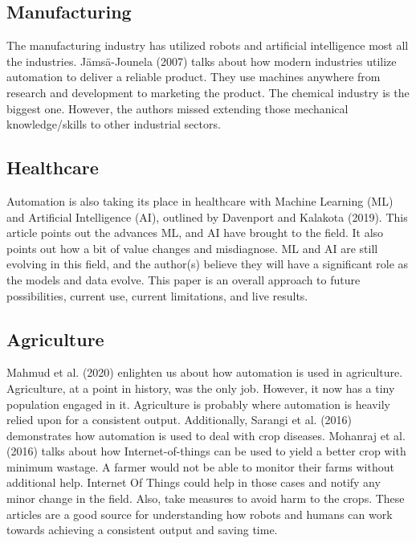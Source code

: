 \documentclass[
  man,floatsintext]{apa7}
\begin{document}
\hypertarget{manufacturing}{%
\subsection{Manufacturing}\label{manufacturing}}

The manufacturing industry has utilized robots and artificial intelligence most all the industries. Jämsä-Jounela (2007) talks about how modern industries utilize automation to deliver a reliable product. They use machines anywhere from research and development to marketing the product. The chemical industry is the biggest one. However, the authors missed extending those mechanical knowledge/skills to other industrial sectors.

\hypertarget{healthcare}{%
\subsection{Healthcare}\label{healthcare}}

Automation is also taking its place in healthcare with Machine Learning (ML) and Artificial Intelligence (AI), outlined by Davenport and Kalakota (2019). This article points out the advances ML, and AI have brought to the field. It also points out how a bit of value changes and misdiagnose. ML and AI are still evolving in this field, and the author(s) believe they will have a significant role as the models and data evolve. This paper is an overall approach to future possibilities, current use, current limitations, and live results.

\hypertarget{agriculture}{%
\subsection{Agriculture}\label{agriculture}}

Mahmud et al. (2020) enlighten us about how automation is used in agriculture. Agriculture, at a point in history, was the only job. However, it now has a tiny population engaged in it. Agriculture is probably where automation is heavily relied upon for a consistent output. Additionally, Sarangi et al. (2016) demonstrates how automation is used to deal with crop diseases. Mohanraj et al. (2016) talks about how Internet-of-things can be used to yield a better crop with minimum wastage. A farmer would not be able to monitor their farms without additional help. Internet Of Things could help in those cases and notify any minor change in the field. Also, take measures to avoid harm to the crops. These articles are a good source for understanding how robots and humans can work towards achieving a consistent output and saving time.
\end{document}
